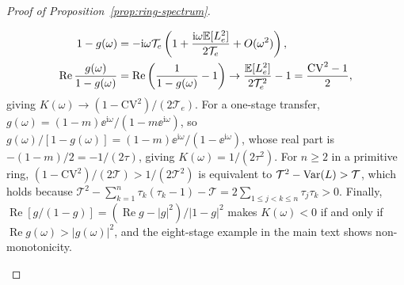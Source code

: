 \begin{proof}[Proof of Proposition~{\upshape\ref{prop:ring-spectrum}}]
\begin{enumerate}
\[
\begin{aligned}
1 - g(\omega) &= -\mathrm{i}\omega\mathcal{T}_e\left(1 + \frac{\mathrm{i}\omega\mathbb{E}[L_e^2]}{2\mathcal{T}_e} + O(\omega^2)\right), \\
\operatorname{Re}\frac{g(\omega)}{1 - g(\omega)} &= \operatorname{Re}\left(\frac{1}{1 - g(\omega)} - 1\right) \to \frac{\mathbb{E}[L_e^2]}{2\mathcal{T}_e^2} - 1 = \frac{\mathrm{CV}^2 - 1}{2},
\end{aligned}
\]
giving $K(\omega) \to (1 - \mathrm{CV}^2)/(2\mathcal{T}_e)$. For a one-stage transfer, $g(\omega) = (1 - m)\ee^{\mathrm{i}\omega}/(1 - m\ee^{\mathrm{i}\omega})$, so $g(\omega)/[1 - g(\omega)] = (1 - m)\ee^{\mathrm{i}\omega}/(1 - \ee^{\mathrm{i}\omega})$, whose real part is $-(1 - m)/2 = -1/(2\tau)$, giving $K(\omega) = 1/(2\tau^2)$. For $n \ge 2$ in a primitive ring, $(1 - \mathrm{CV}^2)/(2\mathcal{T}) > 1/(2\mathcal{T}^2)$ is equivalent to $\mathcal{T}^2 - \operatorname{Var}(L) > \mathcal{T}$, which holds because $\mathcal{T}^2 - \sum_{k=1}^n \tau_k(\tau_k - 1) - \mathcal{T} = 2\sum_{1 \le j < k \le n} \tau_j\tau_k > 0$. Finally, $\operatorname{Re}[g/(1 - g)] = (\operatorname{Re} g - |g|^2)/|1 - g|^2$ makes $K(\omega) < 0$ if and only if $\operatorname{Re} g(\omega) > |g(\omega)|^2$, and the eight-stage example in the main text shows non-monotonicity. \qedhere
\end{enumerate}
\end{proof}

